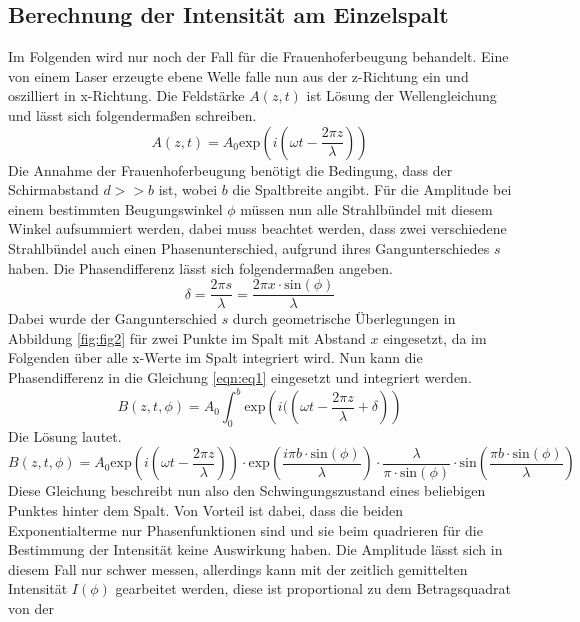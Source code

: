 \subsection{Berechnung der Intensität am Einzelspalt}
Im Folgenden wird nur noch der Fall für die Frauenhoferbeugung behandelt. 
Eine von einem Laser erzeugte ebene Welle falle nun aus der z-Richtung ein und oszilliert in x-Richtung. Die Feldstärke $A(z,t)$ ist Lösung der Wellengleichung und lässt sich folgendermaßen schreiben.
\begin{equation}
    \label{eqn:eq1}
   A(z,t)  = A_{0} \text{exp}\left(i\left(\omega t - \frac{2\pi z}{\lambda} \right)\right)
\end{equation}
 Die Annahme der Frauenhoferbeugung benötigt die Bedingung, dass der Schirmabstand $d >> b$ ist, wobei $b$ die Spaltbreite angibt. Für die Amplitude bei einem bestimmten Beugungswinkel $\phi$ müssen nun alle Strahlbündel mit diesem Winkel aufsummiert werden, dabei muss beachtet werden, dass zwei verschiedene Strahlbündel auch einen Phasenunterschied, aufgrund ihres Gangunterschiedes $s$ haben. Die Phasendifferenz lässt sich folgendermaßen angeben.
 \begin{equation}
     \delta = \frac{2\pi s}{\lambda} = \frac{2\pi x \cdot \text{sin}(\phi) }{\lambda}
 \end{equation}
Dabei wurde der Gangunterschied $s$ durch geometrische Überlegungen in Abbildung \ref{fig:fig2} für zwei Punkte im Spalt mit Abstand $x$ eingesetzt, da im Folgenden über alle x-Werte im Spalt integriert wird.
Nun kann die Phasendifferenz in die Gleichung \eqref{eqn:eq1} eingesetzt und integriert werden.
\begin{equation}
B(z, t, \phi) =  A_{0} \int_{0}^{b} \text{exp} \left( i(\left( \omega t - \frac{2\pi z}{\lambda} + \delta\right)\right)
\end{equation}
Die Lösung lautet.
\begin{equation}
    \label{eqn:eq2}
    B(z, t, \phi) =  A_{0} \text{exp}\left(i\left(\omega t - \frac{2\pi z}{\lambda} \right)\right) \cdot \text{exp}\left( \frac{i \pi b \cdot \text{sin}(\phi)}{\lambda}\right) \cdot \frac{\lambda}{\pi \cdot \text{sin}(\phi)} \cdot \text{sin}\left( \frac{\pi b  \cdot \text{sin}(\phi)}{\lambda} \right)
\end{equation}
Diese Gleichung beschreibt nun also den Schwingungszustand eines beliebigen Punktes hinter dem Spalt. Von Vorteil ist dabei, dass die beiden Exponentialterme nur Phasenfunktionen sind und sie
beim quadrieren für die Bestimmung der Intensität keine Auswirkung haben. Die Amplitude lässt sich in diesem Fall nur schwer messen, allerdings kann mit der zeitlich gemittelten Intensität $I(\phi)$ gearbeitet werden, diese ist proportional zu dem Betragsquadrat von der 
